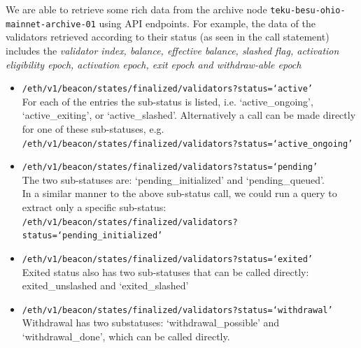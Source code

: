 \documentclass[UTF8]{article}
\begin{document}
We are able to retrieve some rich data from the archive node \texttt{teku-besu-ohio-mainnet-archive-01} using API endpoints. For example, the data of the validators retrieved according to their status (as seen in the call statement)  includes the \textit{validator index, balance, effective balance, slashed flag, activation eligibility epoch, activation epoch, exit epoch and withdraw-able epoch}
\begin{itemize}
\item \texttt{/eth/v1/beacon/states/finalized/validators?status=`active'} \\
For each of the entries the sub-status is listed, i.e. `active\_ongoing', `active\_exiting', or `active\_slashed'. Alternatively a call can be made directly for one of these sub-statuses, e.g. \\
 \texttt{/eth/v1/beacon/states/finalized/validators?status=`active\_ongoing'}
\item \texttt{/eth/v1/beacon/states/finalized/validators?status=`pending'}\\
The two sub-statuses are: `pending\_initialized' and `pending\_queued'. \\
In a similar manner to the above sub-status call, we could run a query to extract only a specific sub-status:\\
\texttt{/eth/v1/beacon/states/finalized/validators?status=`pending\_initialized'}
\item \texttt{/eth/v1/beacon/states/finalized/validators?status=`exited'} \\
Exited status also has two sub-statuses that can be called directly: exited\_unslashed and `exited\_slashed'
\item \texttt{/eth/v1/beacon/states/finalized/validators?status=`withdrawal'} \\
Withdrawal has two substatuses: `withdrawal\_possible' and `withdrawal\_done', which can be called directly.
\end{itemize}
\clearpage
\end{document}
